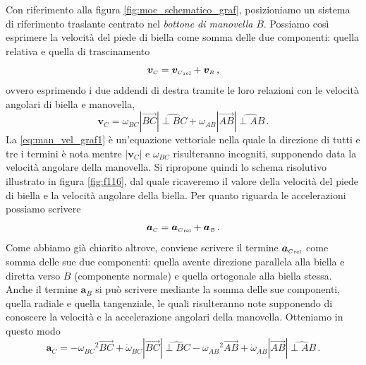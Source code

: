 \noindent Con riferimento alla figura \ref{fig:moc_schematico_graf},
posizioniamo un sistema di riferimento traslante centrato nel
{\em bottone di manovella} $B$. 
Possiamo cos\`i esprimere la velocit\`a del piede di biella come somma delle
due componenti:
quella relativa
e quella di trascinamento
\begin{equation}
{{\bm v}_{\scriptscriptstyle{C}}}= 
{{\bm v}_{\scriptscriptstyle{C}}}_{\scriptscriptstyle{{\rm rel}}}+
{{\bm v}_{\scriptscriptstyle{B}}}\,,
\label{eq:man_vel_graf0}
\end{equation}
\noindent ovvero esprimendo i due addendi di destra tramite le loro relazioni con
le velocit\`a angolari di biella e manovella,
\begin{equation}
{{\bm v}_{\scriptscriptstyle{C}}}= 
{\omega_{\scriptscriptstyle{BC}}}|\overrightarrow{BC}|\widehat{{\perp{BC}}}+
{\omega_{\scriptscriptstyle{AB}}}|\overrightarrow{AB}|\widehat{{\perp{AB}}}\,.
\label{eq:man_vel_graf1}
\end{equation}
\noindent La \ref{eq:man_vel_graf1} \`e un'equazione vettoriale nella quale
la direzione di tutti e tre i termini \`e nota
mentre $|{{\bm v}_{\scriptscriptstyle{C}}}|$ e 
${\omega_{\scriptscriptstyle{BC}}}$ risulteranno incogniti, supponendo data
la velocit\`a angolare della manovella. Si ripropone quindi
lo schema risolutivo illustrato in figura \ref{fig:f116},
dal quale ricaveremo
il valore della velocit\`a del piede di biella e la velocit\`a angolare
della biella.
Per quanto riguarda le accelerazioni possiamo scrivere
\begin{equation}
{{\bm a}_{\scriptscriptstyle{C}}}= 
{{\bm a}_{\scriptscriptstyle{C}}}_{\scriptscriptstyle{{\rm rel}}}+ 
{{\bm a}_{\scriptscriptstyle{B}}}\,. 
\label{eq:acc_man_graf0}
\end{equation}
\noindent Come abbiamo gi\`a chiarito altrove, conviene scrivere il termine
${{\bm a}_{\scriptscriptstyle{C}}}_{\scriptscriptstyle{{\rm rel}}}$
 come somma delle sue due
componenti: quella avente direzione parallela alla biella e diretta verso $B$
(componente normale) e quella ortogonale alla biella stessa.
Anche il termine ${{\bm a}_{\scriptscriptstyle{B}}}$ si pu\`o scrivere 
mediante la somma delle sue componenti,
quella radiale e quella tangenziale, le quali
risulteranno note
supponendo di conoscere la velocit\`a e la accelerazione angolari della
manovella.  Otteniamo in questo modo
\begin{equation}
{{\bm a}_{\scriptscriptstyle{C}}}= 
-{\omega_{\scriptscriptstyle{BC}}}^2 \overrightarrow{BC}+
{\dot\omega_{\scriptscriptstyle{BC}}}|\overrightarrow{BC}|\widehat{{\perp{BC}}}
-{\omega_{\scriptscriptstyle{AB}}}^2 \overrightarrow{AB}+
{\dot\omega_{\scriptscriptstyle{AB}}}|\overrightarrow{AB}|\widehat{{\perp{AB}}}\,.
\label{eq:acc_man_graf1}
\end{equation}
